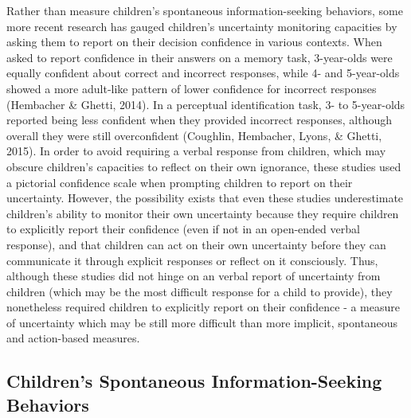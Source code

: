 \documentclass[,man,floatsintext]{apa6}
\begin{document}
Rather than measure children's spontaneous information-seeking behaviors, some more recent research has gauged children's uncertainty monitoring capacities by asking them to report on their decision confidence in various contexts. When asked to report confidence in their answers on a memory task, 3-year-olds were equally confident about correct and incorrect responses, while 4- and 5-year-olds showed a more adult-like pattern of lower confidence for incorrect responses (Hembacher \& Ghetti, 2014). In a perceptual identification task, 3- to 5-year-olds reported being less confident when they provided incorrect responses, although overall they were still overconfident (Coughlin, Hembacher, Lyons, \& Ghetti, 2015). In order to avoid requiring a verbal response from children, which may obscure children's capacities to reflect on their own ignorance, these studies used a pictorial confidence scale when prompting children to report on their uncertainty. However, the possibility exists that even these studies underestimate children's ability to monitor their own uncertainty because they require children to explicitly report their confidence (even if not in an open-ended verbal response), and that children can act on their own uncertainty before they can communicate it through explicit responses or reflect on it consciously. Thus, although these studies did not hinge on an verbal report of uncertainty from children (which may be the most difficult response for a child to provide), they nonetheless required children to explicitly report on their confidence - a measure of uncertainty which may be still more difficult than more implicit, spontaneous and action-based measures.

\hypertarget{childrens-spontaneous-information-seeking-behaviors}{%
\subsection{Children's Spontaneous Information-Seeking Behaviors}\label{childrens-spontaneous-information-seeking-behaviors}}
\end{document}
